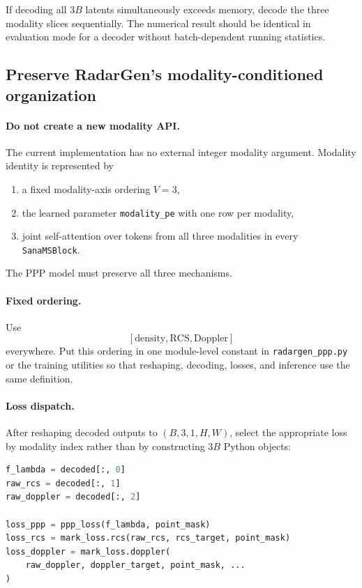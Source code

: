 \documentclass[11pt,a4paper]{article}
\begin{document}
If decoding all \(3B\) latents simultaneously exceeds memory, decode the three modality slices sequentially. The numerical result should be identical in evaluation mode for a decoder without batch-dependent running statistics.

\subsection{Preserve RadarGen's modality-conditioned organization}

\paragraph{Do not create a new modality API.}
The current implementation has no external integer modality argument. Modality identity is represented by
\begin{enumerate}[label=\arabic*.]
    \item a fixed modality-axis ordering \(V=3\),
    \item the learned parameter \texttt{modality\_pe} with one row per modality,
    \item joint self-attention over tokens from all three modalities in every \texttt{SanaMSBlock}.
\end{enumerate}

The PPP model must preserve all three mechanisms.

\paragraph{Fixed ordering.}
Use
\[
    [\mathrm{density},\mathrm{RCS},\mathrm{Doppler}]
\]
everywhere. Put this ordering in one module-level constant in \texttt{radargen\_ppp.py} or the training utilities so that reshaping, decoding, losses, and inference use the same definition.

\paragraph{Loss dispatch.}
After reshaping decoded outputs to \((B,3,1,H,W)\), select the appropriate loss by modality index rather than by constructing \(3B\) Python objects:
\begin{lstlisting}[language=Python]
f_lambda = decoded[:, 0]
raw_rcs = decoded[:, 1]
raw_doppler = decoded[:, 2]

loss_ppp = ppp_loss(f_lambda, point_mask)
loss_rcs = mark_loss.rcs(raw_rcs, rcs_target, point_mask)
loss_doppler = mark_loss.doppler(
    raw_doppler, doppler_target, point_mask, ...
)
\end{lstlisting}
\end{document}
